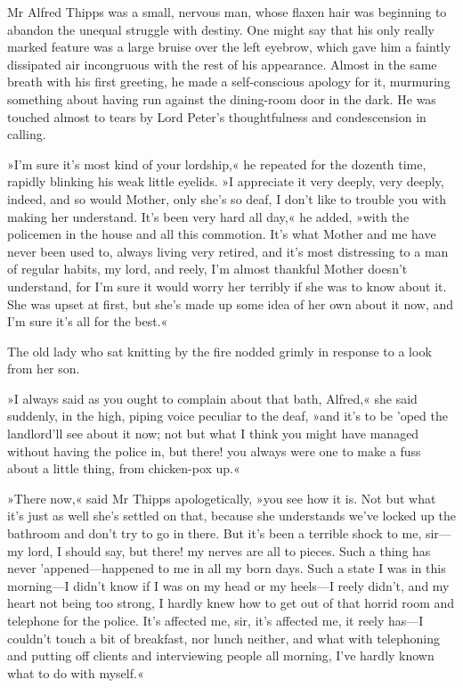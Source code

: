 Mr Alfred Thipps was a small, nervous man, whose flaxen hair was beginning to abandon the unequal struggle with destiny. One might say that his only really marked feature was a large bruise over the left eyebrow, which gave him a faintly dissipated air incongruous with the rest of his appearance. Almost in the same breath with his first greeting, he made a self-conscious apology for it, murmuring something about having run against the dining-room door in the dark. He was touched almost to tears by Lord Peter's thoughtfulness and condescension in calling.

»I'm sure it's most kind of your lordship,« he repeated for the dozenth time, rapidly blinking his weak little eyelids. »I appreciate it very deeply, very deeply, indeed, and so would Mother, only she's so deaf, I don't like to trouble you with making her understand. It's been very hard all day,« he added, »with the policemen in the house and all this commotion. It's what Mother and me have never been used to, always living very retired, and it's most distressing to a man of regular habits, my lord, and reely, I'm almost thankful Mother doesn't understand, for I'm sure it would worry her terribly if she was to know about it. She was upset at first, but she's made up some idea of her own about it now, and I'm sure it's all for the best.«

The old lady who sat knitting by the fire nodded grimly in response to a look from her son.

»I always said as you ought to complain about that bath, Alfred,« she said suddenly, in the high, piping voice peculiar to the deaf, »and it's to be 'oped the landlord'll see about it now; not but what I think you might have managed without having the police in, but there! you always were one to make a fuss about a little thing, from chicken-pox up.«

»There now,« said Mr Thipps apologetically, »you see how it is. Not but what it's just as well she's settled on that, because she understands we've locked up the bathroom and don't try to go in there. But it's been a terrible shock to me, sir\allowbreak---\allowbreak my lord, I should say, but there! my nerves are all to pieces. Such a thing has never 'appened\allowbreak---\allowbreak happened to me in all my born days. Such a state I was in this morning\allowbreak---\allowbreak I didn't know if I was on my head or my heels\allowbreak---\allowbreak I reely didn't, and my heart not being too strong, I hardly knew how to get out of that horrid room and telephone for the police. It's affected me, sir, it's affected me, it reely has\allowbreak---\allowbreak I couldn't touch a bit of breakfast, nor lunch neither, and what with telephoning and putting off clients and interviewing people all morning, I've hardly known what to do with myself.«

